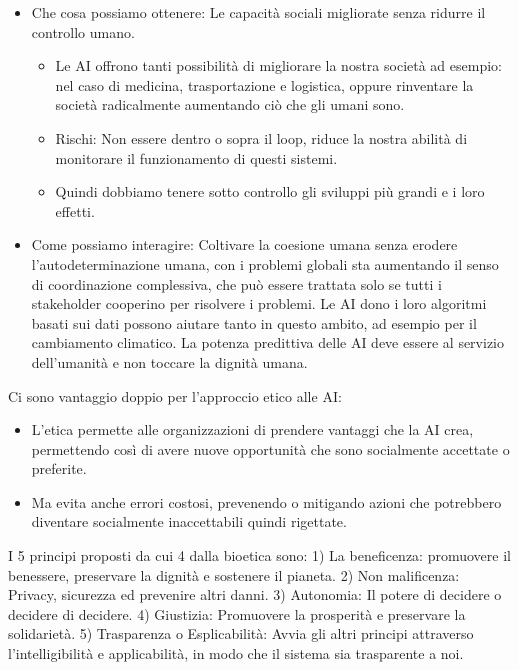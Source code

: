 \documentclass[]{article}
\begin{document}
\begin{itemize}
	\item
	Che cosa possiamo ottenere: Le capacità sociali migliorate senza
	ridurre il controllo umano.
	
	\begin{itemize}
		 
		\item
		Le AI offrono tanti possibilità di migliorare la nostra società ad
		esempio: nel caso di medicina, trasportazione e logistica, oppure
		rinventare la società radicalmente aumentando ciò che gli umani
		sono.
		\item
		Rischi: Non essere dentro o sopra il loop, riduce la nostra abilità
		di monitorare il funzionamento di questi sistemi.
		\item
		Quindi dobbiamo tenere sotto controllo gli sviluppi più grandi e i
		loro effetti.
	\end{itemize}
	\item
	Come possiamo interagire: Coltivare la coesione umana senza erodere
	l'autodeterminazione umana, con i problemi globali sta aumentando il
	senso di coordinazione complessiva, che può essere trattata solo se
	tutti i stakeholder cooperino per risolvere i problemi. Le AI dono i
	loro algoritmi basati sui dati possono aiutare tanto in questo ambito,
	ad esempio per il cambiamento climatico. La potenza predittiva delle
	AI deve essere al servizio dell'umanità e non toccare la dignità
	umana.
\end{itemize}

Ci sono vantaggio doppio per l'approccio etico alle AI:

\begin{itemize}
	 
	\item
	L'etica permette alle organizzazioni di prendere vantaggi che la AI
	crea, permettendo così di avere nuove opportunità che sono socialmente
	accettate o preferite.
	\item
	Ma evita anche errori costosi, prevenendo o mitigando azioni che
	potrebbero diventare socialmente inaccettabili quindi rigettate.
\end{itemize}

I 5 principi proposti da cui 4 dalla bioetica sono: 1) La beneficenza:
promuovere il benessere, preservare la dignità e sostenere il pianeta.
2) Non malificenza: Privacy, sicurezza ed prevenire altri danni. 3)
Autonomia: Il potere di decidere o decidere di decidere. 4) Giustizia:
Promuovere la prosperità e preservare la solidarietà. 5) Trasparenza o
Esplicabilità: Avvia gli altri principi attraverso l'intelligibilità e
applicabilità, in modo che il sistema sia trasparente a noi.
\end{document}
